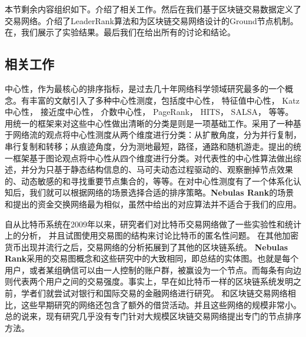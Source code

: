 
本节剩余内容组织如下。介绍了相关工作。然后在我们基于区块链交易数据定义了交易网络。介绍了LeaderRank算法和为区块链交易网络设计的Ground节点机制。在，我们展示了实验结果。最后我们在给出所有的讨论和结论。

\subsection{相关工作} \label{sec:related}
中心性，作为最核心的排序指标，是过去几十年网络科学领域研究最多的一个概念\cite{newman2010networks}。有丰富的文献引入了多种中心性测度，包括度中心性\cite{freeman1979set}， 特征值中心性\cite{bonacich1972factoring}， Katz中心性\cite{katz1953new}， 接近度中心性\cite{sabidussi1966centrality}， 介数中心性\cite{freeman1977set}\cite{freeman1978centrality}\cite{freeman1991centrality}\cite{noh2004random}\cite{newman2005measure}， PageRank\cite{Brin2010}， HITS\cite{kleinberg1999authoritative}， SALSA\cite{Science2001}， 等等。 用统一的框架来对这些中心性做出清晰的分类是则是一项基础工作。\textcite{Borgatti2005}采用了一种基于网络流的观点将中心性测度从两个维度进行分类：从扩散角度，分为并行复制，串行复制和转移；从痕迹角度，分为测地最短，路径，通路和随机游走。\textcite{Borgatti2006}提出的统一框架基于图论观点将中心性从四个维度进行分类。\textcite{Lu2016}对代表性的中心性算法做出综述，并分为只基于静态结构信息的、马可夫动态过程驱动的、观察删掉节点效果的、动态敏感的和寻找重要节点集合的，等等。在对中心性测度有了一个体系化认知后，我们就可以根据网络的场景选择合适的排序策略。\textbf{Nebulas Rank}的场景和\cite{Borgatti2005}提出的资金交换网络最为相似，虽然\cite{Borgatti2005}中给出的对应算法并不适合于我们的应用。

自从比特币\cite{Nakamoto2008}系统在2009年以来，研究者们对比特币交易网络做了一些实验性和统计上的分析\cite{Ron}\cite{Haslhofer}\cite{NielKondor2014}\cite{Baumann2014}， 并且试图使用交易图的结构来讨论比特币的匿名性问题\cite{Meiklejohn2013}\cite{Ober2013}\cite{pham2016anomaly}\cite{Fleder2015}\cite{Ferrin2015}。 在其他加密货币出现并流行之后，交易网络的分析拓展到了其他的区块链系统\cite{Chang2017}\cite{Anderson2016}。 \textbf{Nebulas Rank}采用的交易图概念和这些研究中的大致相同，即\textcite{Tschorsch2015}总结的实体图。也就是每个用户，或者某组确信可以由一人控制的账户群，被赢设为一个节点。而每条有向边则代表两个用户之间的交易强度。事实上，早在如比特币一样的区块链系统发明之前，学者们就尝试对银行和国际交易的金融网络进行研究\cite{propper2008towards}\cite{Boss2004}\cite{Serrano2007}\cite{Bech2008}\cite{Fagiolo2009}\cite{Morten2006}\cite{Boss2004a}\cite{Krempel2002}\cite{Serrano2003}。 和区块链交易网络相比，这些早期研究的网络还包含了额外的借贷活动。并且这些网络的规模非常小。总的说来，现有研究几乎没有专门针对大规模区块链交易网络提出专门的节点排序方法。

